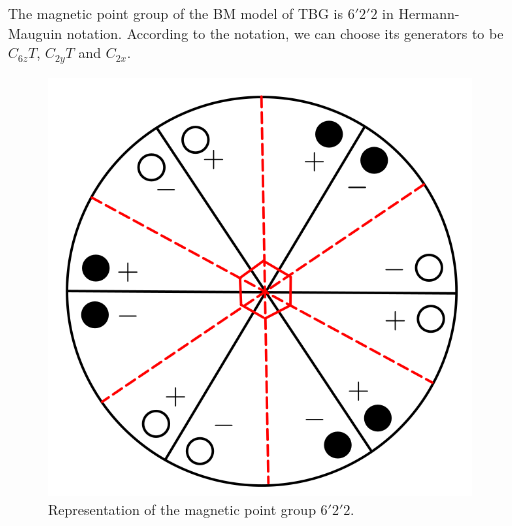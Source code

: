 The magnetic point group of the BM model of TBG is $6'2'2$ in Hermann-Mauguin notation. According to the notation, we can choose its generators to be $C_{6z} T$, $C_{2y} T$ and $C_{2x}$.

\begin{figure}[H]
\centering
\includegraphics[width=0.5\linewidth]{fig/622_magnetic.png}
\caption{Representation of the magnetic point group $6'2'2$.}
\label{fig:622_magnetic}
\end{figure}






%



